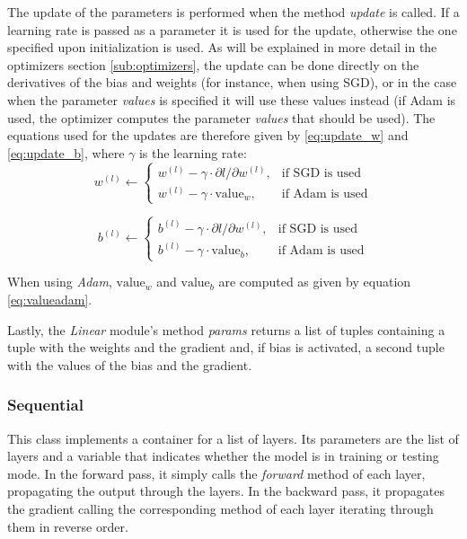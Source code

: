 \documentclass[10pt,conference,compsocconf]{IEEEtran}
\begin{document}
        The update of the parameters is performed when the method \textit{update} is called. If a learning rate is passed as a parameter it is used for the update, otherwise the one specified upon initialization is used. As will be explained in more detail in the optimizers section \ref{sub:optimizers}, the update can be done directly on the derivatives of the bias and weights (for instance, when using SGD), or in the case when the parameter \textit{values} is specified it will use these values instead (if Adam is used, the optimizer computes the parameter \textit{values} that should be used). The equations used for the updates are therefore given by \ref{eq:update_w} and \ref{eq:update_b}, where $\gamma$ is the learning rate:
        \begin{equation} 
            \label{eq:update_w}
            w^{(l)}\leftarrow
            \begin{cases}
              w^{(l)} -  \gamma \cdot \partial l/\partial w^{(l)}, & \text{if SGD is used} \\
              w^{(l)} -  \gamma \cdot \text{value}_w, & \text{if Adam is used}
            \end{cases}
        \end{equation}
        
        \begin{equation}
            \label{eq:update_b}
            b^{(l)}\leftarrow
            \begin{cases}
              b^{(l)} -  \gamma \cdot \partial l/\partial w^{(l)}, & \text{if SGD is used} \\
              b^{(l)} -  \gamma \cdot \text{value}_b, & \text{if Adam is used}
            \end{cases}
        \end{equation}
        
        When using \textit{Adam}, $\text{value}_w$ and $\text{value}_b$ are computed as given by equation \ref{eq:valueadam}.
        
        Lastly, the \textit{Linear} module's method \textit{params} returns a list of tuples containing a tuple with the weights and the gradient and, if bias is activated, a second tuple with the values of the bias and the gradient.

  	\subsubsection{Sequential} %
  	\label{ssub:sequential}
        This class implements a container for a list of layers. Its parameters are the list of layers and a variable that indicates whether the model is in training or testing mode. In the forward pass, it simply calls the \textit{forward} method of each layer, propagating the output through the layers. In the backward pass, it propagates the gradient calling the corresponding method of each layer iterating through them in reverse order.
        
\end{document}
